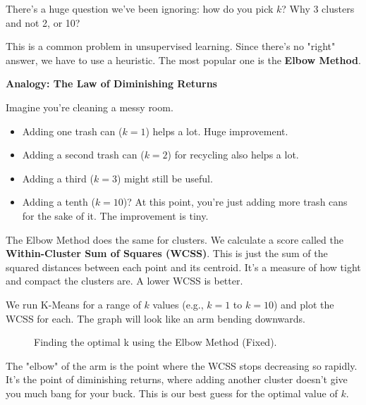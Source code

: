 \documentclass[11pt, letterpaper, openany]{book}
\begin{document}
There's a huge question we've been ignoring: how do you pick $k$? Why 3 clusters and not 2, or 10?

This is a common problem in unsupervised learning. Since there's no "right" answer, we have to use a heuristic. The most popular one is the \textbf{Elbow Method}.

\textbf{Analogy: The Law of Diminishing Returns}

Imagine you're cleaning a messy room.
\begin{itemize}
    \item Adding one trash can ($k=1$) helps a lot. Huge improvement.
    \item Adding a second trash can ($k=2$) for recycling also helps a lot.
    \item Adding a third ($k=3$) might still be useful.
    \item Adding a tenth ($k=10$)? At this point, you're just adding more trash cans for the sake of it. The improvement is tiny.
\end{itemize}
The Elbow Method does the same for clusters. We calculate a score called the \textbf{Within-Cluster Sum of Squares (WCSS)}. This is just the sum of the squared distances between each point and its centroid. It's a measure of how tight and compact the clusters are. A lower WCSS is better.

We run K-Means for a range of $k$ values (e.g., $k=1$ to $k=10$) and plot the WCSS for each. The graph will look like an arm bending downwards.

\begin{figure}[h!]
\centering
{}
\caption{Finding the optimal k using the Elbow Method (Fixed).}
\end{figure}

The "elbow" of the arm is the point where the WCSS stops decreasing so rapidly. It's the point of diminishing returns, where adding another cluster doesn't give you much bang for your buck. This is our best guess for the optimal value of $k$.
\end{document}
